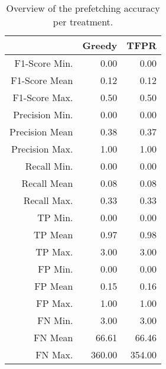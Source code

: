 \begin{table}[ht]
\centering
\begin{tabular}{rrr}
  \hline
 & Greedy & TFPR \\ 
  \hline
F1-Score Min. & 0.00 & 0.00 \\ 
  F1-Score Mean & 0.12 & 0.12 \\ 
  F1-Score Max. & 0.50 & 0.50 \\ 
  Precision Min. & 0.00 & 0.00 \\ 
  Precision Mean & 0.38 & 0.37 \\ 
  Precision Max. & 1.00 & 1.00 \\ 
  Recall Min. & 0.00 & 0.00 \\ 
  Recall Mean & 0.08 & 0.08 \\ 
  Recall Max. & 0.33 & 0.33 \\ 
  TP Min. & 0.00 & 0.00 \\ 
  TP Mean & 0.97 & 0.98 \\ 
  TP Max. & 3.00 & 3.00 \\ 
  FP Min. & 0.00 & 0.00 \\ 
  FP Mean & 0.15 & 0.16 \\ 
  FP Max. & 1.00 & 1.00 \\ 
  FN Min. & 3.00 & 3.00 \\ 
  FN Mean & 66.61 & 66.46 \\ 
  FN Max. & 360.00 & 354.00 \\ 
   \hline
\end{tabular}
\caption{Overview of the prefetching accuracy per treatment.} 
\label{tab:results:rq3:summary:treatment}
\end{table}
